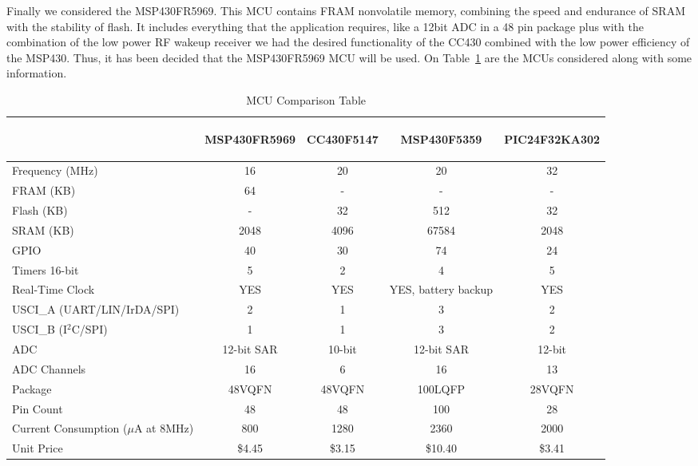 Finally we considered the MSP430FR5969. This MCU contains FRAM nonvolatile memory, combining the speed and endurance of SRAM with the stability of flash. It includes everything that the application requires, like a 12bit ADC in a 48 pin package plus with the combination of the low power RF wakeup receiver we had the desired functionality of the CC430 combined with the low power efficiency of the MSP430. Thus, it has been decided that the MSP430FR5969 MCU will be used. On Table~\ref{tab:mcuComp} are the MCUs considered along with some information.
\begin{table}[H]
\setlength{\extrarowheight}{1.5pt}
  \centering
  \caption{MCU Comparison Table}
    \begin{tabular}{|m{1.5in}|c|c|c|c|}
    \cline{2-5}
    \multicolumn{1}{c|}{} & \begin{sideways}MSP430FR5969 \end{sideways} &\begin{sideways} CC430F5147 \end{sideways}& \begin{sideways}MSP430F5359 \end{sideways}& \begin{sideways}PIC24F32KA302\end{sideways}\\ 
    \hline
    Frequency (MHz) & 16    & 20    & 20    & 32\\ \hline
    FRAM (KB) & 64    & -     & -     & -\\ \hline
    Flash (KB) & -     & 32    & 512   & 32\\ \hline
    SRAM (KB) & 2048  & 4096  & 67584 & 2048 \\ \hline
    GPIO  & 40    & 30    & 74    & 24    \\ \hline
    Timers 16-bit & 5     & 2     & 4     & 5     \\ \hline
    Real-Time Clock & YES   & YES   & YES, battery backup & YES   \\ \hline
    USCI\_A (UART/LIN/IrDA/SPI) & 2     & 1     & 3     & 2     \\ \hline
    USCI\_B (I$^2$C/SPI) & 1     & 1     & 3     & 2     \\ \hline
    ADC   & 12-bit SAR & 10-bit & 12-bit SAR & 12-bit \\ \hline
    ADC Channels & 16    & 6     & 16    & 13    \\ \hline
    Package & 48VQFN & 48VQFN & 100LQFP & 28VQFN \\ \hline
    Pin Count & 48    & 48    & 100   & 28    \\ \hline
    Current Consumption ($\mu$A at 8MHz) & 800   & 1280  & 2360  & 2000  \\ \hline
    Unit Price & \$4.45  & \$3.15  & \$10.40 & \$3.41  \\ \hline
    \end{tabular}%
  \label{tab:mcuComp}%
\end{table}%
